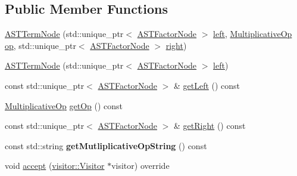 \subsection*{Public Member Functions}
\begin{DoxyCompactItemize}
\item 
\hyperlink{classparser_1_1ast_1_1ASTTermNode_ab37b86959cf1761c460ca678dc44aa3e}{A\+S\+T\+Term\+Node} (std\+::unique\+\_\+ptr$<$ \hyperlink{classparser_1_1ast_1_1ASTFactorNode}{A\+S\+T\+Factor\+Node} $>$ \hyperlink{classparser_1_1ast_1_1ASTTermNode_a268410bee7baf3e6dd0a1fa64fc0c0e2}{left}, \hyperlink{ASTTermNode_8h_a56419c32f44e139982c327d8375a27a7}{Multiplicative\+Op} \hyperlink{classparser_1_1ast_1_1ASTTermNode_a5fca22b04d30310ff59616a7e0863a54}{op}, std\+::unique\+\_\+ptr$<$ \hyperlink{classparser_1_1ast_1_1ASTFactorNode}{A\+S\+T\+Factor\+Node} $>$ \hyperlink{classparser_1_1ast_1_1ASTTermNode_a339078e4e969f51d2da01a39585db008}{right})
\item 
\hyperlink{classparser_1_1ast_1_1ASTTermNode_ac8e1cb1e76e14a3f472ea58e27d079be}{A\+S\+T\+Term\+Node} (std\+::unique\+\_\+ptr$<$ \hyperlink{classparser_1_1ast_1_1ASTFactorNode}{A\+S\+T\+Factor\+Node} $>$ \hyperlink{classparser_1_1ast_1_1ASTTermNode_a268410bee7baf3e6dd0a1fa64fc0c0e2}{left})
\item 
const std\+::unique\+\_\+ptr$<$ \hyperlink{classparser_1_1ast_1_1ASTFactorNode}{A\+S\+T\+Factor\+Node} $>$ \& \hyperlink{classparser_1_1ast_1_1ASTTermNode_a33fd3c6c4e20f282adac752fa222d569}{get\+Left} () const
\item 
\hyperlink{ASTTermNode_8h_a56419c32f44e139982c327d8375a27a7}{Multiplicative\+Op} \hyperlink{classparser_1_1ast_1_1ASTTermNode_a8216196b573296bb0a0bee30a908a9af}{get\+Op} () const
\item 
const std\+::unique\+\_\+ptr$<$ \hyperlink{classparser_1_1ast_1_1ASTFactorNode}{A\+S\+T\+Factor\+Node} $>$ \& \hyperlink{classparser_1_1ast_1_1ASTTermNode_aa7e15b30a84f8afcd75f85c354103ca0}{get\+Right} () const
\item 
\mbox{\label{classparser_1_1ast_1_1ASTTermNode_a1e4ede7d3314cc5b5934f7754364acd9}} 
const std\+::string {\bfseries get\+Mutliplicative\+Op\+String} () const
\item 
void \hyperlink{classparser_1_1ast_1_1ASTTermNode_a4937651cff0fac499c76f8f38fa4795d}{accept} (\hyperlink{classvisitor_1_1Visitor}{visitor\+::\+Visitor} $\ast$visitor) override
\end{DoxyCompactItemize}
